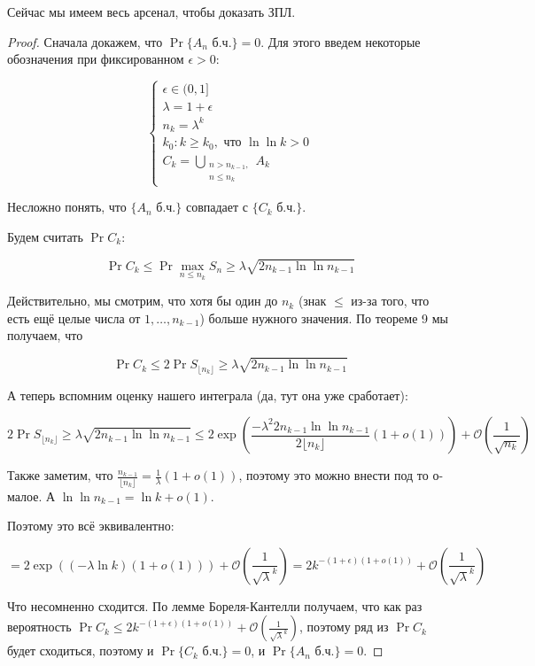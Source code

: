 Сейчас мы имеем весь арсенал, чтобы доказать ЗПЛ.

\begin{proof}
  Сначала докажем, что $\Pr{\{\text{$A_n$ б.ч.}\}} = 0$. Для этого введем некоторые
  обозначения при фиксированном $\epsilon > 0$:

  \[
    \begin{cases}
      \epsilon \in (0, 1]\\
      \lambda = 1 + \epsilon\\
      n_k = \lambda^k\\
      k_0: k \geq k_0, \text{ что } \ln\ln k > 0\\
      C_k = \bigcup\limits_{\substack{n > n_{k - 1},\\n \leq n_k}} A_k
    \end{cases}
  \]

  Несложно понять, что $\{A_n\text{ б.ч.}\}$ совпадает с $\{C_k\text{ б.ч.}\}$.

  Будем считать $\Pr{C_k}$:

  \[
    \Pr{C_k} \leq \Pr{\max\limits_{n \leq n_k} S_n \geq \lambda\sqrt{2n_{k - 1}\ln\ln n_{k - 1}}}
  \]

  Действительно, мы смотрим, что хотя бы один до $n_k$ (знак $\leq$ из-за того,
  что есть ещё целые числа от $1,\ldots,n_{k - 1}$) больше нужного значения.
  По теореме 9 мы получаем, что

  \[
    \Pr{C_k} \leq 2\Pr{S_{\lfloor n_k\rfloor} \geq \lambda\sqrt{2n_{k - 1}\ln\ln n_{k - 1}}}
  \]

  А теперь вспомним оценку нашего интеграла (да, тут она уже сработает):

  \[
    2\Pr{S_{\lfloor n_k\rfloor} \geq \lambda\sqrt{2n_{k - 1}\ln\ln n_{k - 1}}}
    \leq 2\exp\left(\frac{-\lambda^2 2 n_{k - 1}\ln\ln n_{k - 1}}{2\lfloor n_k\rfloor}(1 + o(1))\right)
    + \mathcal{O}\left(\frac{1}{\sqrt{n_k}}\right)
  \]

  Также заметим, что $\frac{n_{k - 1}}{\lfloor n_k \rfloor} = \frac{1}{\lambda}(1 + o(1))$,
  поэтому это можно внести под то о-малое. А $\ln\ln n_{k - 1} = \ln k + o(1)$.

  Поэтому это всё эквивалентно:

  \[
    = 2\exp\left((-\lambda \ln k)(1 + o(1))\right)
    + \mathcal{O}\left(\frac{1}{\sqrt{\lambda}^k}\right) = 
    2 k^{-(1 + \epsilon)(1 + o(1))} 
    + \mathcal{O}\left(\frac{1}{\sqrt{\lambda}^k}\right)
  \]

  Что несомненно сходится. По лемме Бореля-Кантелли получаем, что как раз
  вероятность $\Pr{C_k} \leqslant  2 k^{-(1 + \epsilon)(1 + o(1))} 
  + \mathcal{O}\left(\frac{1}{\sqrt{\lambda}^k}\right)$, поэтому ряд
  из $\Pr{C_k}$ будет сходиться, поэтому и  $\Pr{\{C_k\text{ б.ч.}\}} = 0$,
  и $\Pr{\{A_n\text{ б.ч.}\}} = 0$.


\end{proof}
